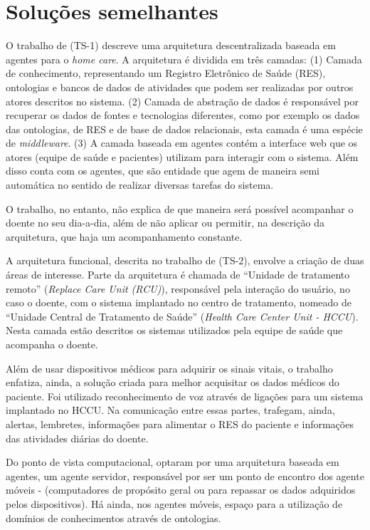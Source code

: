 \section{Soluções semelhantes} \label{sec:solucoes-semelhantes}

O trabalho de  (TS-1) descreve uma arquitetura
descentralizada baseada em agentes para o \textit{home care}. A arquitetura é
dividida em três camadas: (1) Camada de conhecimento, representando um Registro
Eletrônico de Saúde (RES), ontologias e bancos de dados de atividades que podem
ser realizadas por outros atores descritos no sistema. (2) Camada de abstração
de dados é responsável por recuperar os dados de fontes e tecnologias
diferentes, como por exemplo os dados das ontologias, de RES e de base de dados
relacionais, esta camada é uma espécie de \textit{middleware}. (3) A camada
baseada em agentes contém a interface web que os atores (equipe de saúde e
pacientes) utilizam para interagir com o sistema. Além disso conta com os
agentes, que são entidade que agem de maneira semi automática no sentido de
realizar diversas tarefas do sistema. 

O trabalho, no entanto, não explica de que maneira será possível acompanhar o
doente no seu dia-a-dia, além de não aplicar ou permitir, na descrição da
arquitetura, que haja um acompanhamento constante.

A arquitetura funcional, descrita no trabalho de  (TS-2),
envolve a criação de duas áreas de interesse. Parte da arquitetura é chamada de
``Unidade de tratamento remoto'' (\textit{Replace Care Unit (RCU)}), responsável
pela interação do usuário, no caso o doente, com o sistema implantado no centro
de tratamento, nomeado de ``Unidade Central de Tratamento de Saúde''
(\textit{Health Care Center Unit - HCCU}). Nesta camada estão descritos os
sistemas utilizados pela equipe de saúde que acompanha o doente.

Além de usar dispositivos médicos para adquirir os sinais vitais, o trabalho
enfatiza, ainda, a solução criada para melhor acquisitar os dados médicos do
paciente. Foi utilizado reconhecimento de voz através de ligações para um
sistema implantado no HCCU. Na comunicação entre essas partes, trafegam, ainda,
alertas, lembretes, informações para alimentar o RES do paciente e informações
das atividades diárias do doente.

Do ponto de vista computacional,  optaram
por uma arquitetura baseada em agentes, um agente servidor, responsável por ser
um ponto de encontro dos agente móveis - (computadores de propósito geral ou
\smartphones[] para repassar os dados adquiridos pelos dispositivos). Há ainda,
nos agentes móveis, espaço para a utilização de domínios de conhecimentos
através de ontologias.
 
